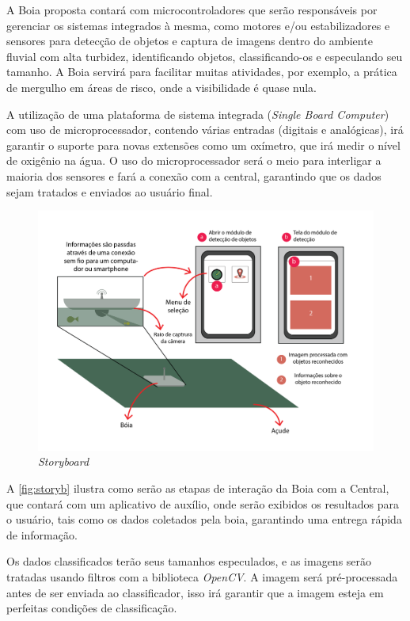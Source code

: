 A Boia proposta contará com microcontroladores que serão responsáveis por gerenciar os sistemas integrados à mesma, como motores e/ou estabilizadores e sensores para detecção de objetos e captura de imagens dentro do ambiente fluvial com alta turbidez, identificando objetos, classificando-os e especulando seu tamanho. A Boia servirá para facilitar muitas atividades, por exemplo, a prática de mergulho em áreas de risco, onde a visibilidade é quase nula.

A utilização de uma plataforma de sistema integrada (\textit{Single Board Computer}) com uso de microprocessador, contendo várias entradas (digitais e analógicas), irá garantir o suporte para novas extensões como um oxímetro, que irá medir o nível de oxigênio na água. O uso do microprocessador será o meio para interligar a maioria dos sensores e fará a conexão com a central, garantindo que os dados sejam tratados e enviados ao usuário final.


\begin{figure}[ht]
	\centering
    \caption{\label{fig:storyb}\textit{Storyboard}}
	\includegraphics[width = 1 \textwidth]{resources/storyboard.png}
\end{figure}

A \autoref{fig:storyb} ilustra como serão as etapas de interação da Boia com a Central, que contará com um aplicativo de auxílio, onde serão exibidos os resultados para o usuário, tais como os dados coletados pela boia, garantindo uma entrega rápida de informação. 

Os dados classificados terão seus tamanhos especulados, e as imagens serão tratadas usando filtros com a biblioteca \textit{OpenCV}\cite{opencv}. A imagem será pré-processada antes de ser enviada ao classificador, isso irá garantir que a imagem esteja em perfeitas condições de classificação.


